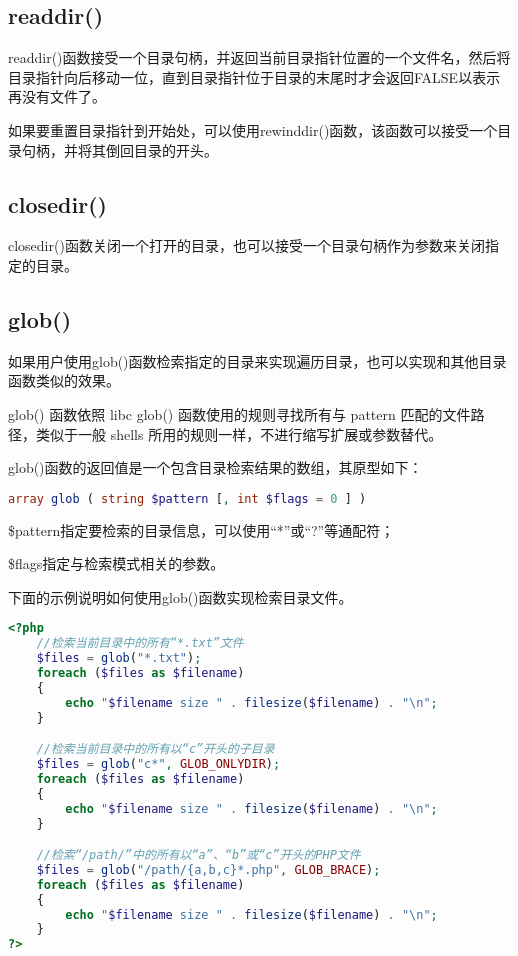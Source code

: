 \subsection{readdir()}

readdir()函数接受一个目录句柄，并返回当前目录指针位置的一个文件名，然后将目录指针向后移动一位，直到目录指针位于目录的末尾时才会返回FALSE以表示再没有文件了。

如果要重置目录指针到开始处，可以使用rewinddir()函数，该函数可以接受一个目录句柄，并将其倒回目录的开头。




\subsection{closedir()}

closedir()函数关闭一个打开的目录，也可以接受一个目录句柄作为参数来关闭指定的目录。




\subsection{glob()}

如果用户使用glob()函数检索指定的目录来实现遍历目录，也可以实现和其他目录函数类似的效果。

glob() 函数依照 libc glob() 函数使用的规则寻找所有与 pattern 匹配的文件路径，类似于一般 shells 所用的规则一样，不进行缩写扩展或参数替代。

glob()函数的返回值是一个包含目录检索结果的数组，其原型如下：

\begin{lstlisting}[language=PHP]
array glob ( string $pattern [, int $flags = 0 ] )
\end{lstlisting}


\begin{compactitem}
\item \$pattern指定要检索的目录信息，可以使用“*”或“?”等通配符；
\item \$flags指定与检索模式相关的参数。
\end{compactitem}

下面的示例说明如何使用glob()函数实现检索目录文件。

\begin{lstlisting}[language=PHP]
<?php
	//检索当前目录中的所有“*.txt”文件
	$files = glob("*.txt");
	foreach ($files as $filename)
	{
	    echo "$filename size " . filesize($filename) . "\n";
	}

	//检索当前目录中的所有以“c”开头的子目录
	$files = glob("c*", GLOB_ONLYDIR);
	foreach ($files as $filename) 
	{
	    echo "$filename size " . filesize($filename) . "\n";
	}

	//检索“/path/”中的所有以“a”、“b”或“c”开头的PHP文件
	$files = glob("/path/{a,b,c}*.php", GLOB_BRACE);
	foreach ($files as $filename)
	{
	    echo "$filename size " . filesize($filename) . "\n";
	}
?>
\end{lstlisting}




